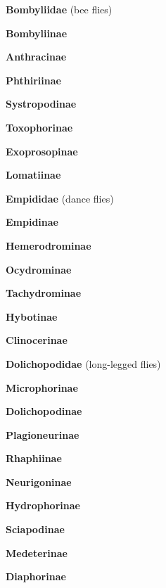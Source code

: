 \documentclass[letterpaper,10pt]{article}
\begin{document}
{\makebox[0.6cm]{}  \textbf{Bombyliidae} (bee flies) \par
\makebox[0.8cm]{}  \textbf{Bombyliinae} \par
\makebox[0.8cm]{}  \textbf{Anthracinae} \par
\makebox[0.8cm]{}  \textbf{Phthiriinae} \par
\makebox[0.8cm]{}  \textbf{Systropodinae} \par
\makebox[0.8cm]{}  \textbf{Toxophorinae} \par
\makebox[0.8cm]{}  \textbf{Exoprosopinae} \par
\makebox[0.8cm]{}  \textbf{Lomatiinae} \par
\makebox[0.6cm]{}  \textbf{Empididae} (dance flies) \par
\makebox[0.8cm]{}  \textbf{Empidinae} \par
\makebox[0.8cm]{}  \textbf{Hemerodrominae} \par
\makebox[0.8cm]{}  \textbf{Ocydrominae} \par
\makebox[0.8cm]{}  \textbf{Tachydrominae} \par
\makebox[0.8cm]{}  \textbf{Hybotinae} \par
\makebox[0.8cm]{}  \textbf{Clinocerinae} \par
\makebox[0.6cm]{}  \textbf{Dolichopodidae} (long-legged flies) \par
\makebox[0.8cm]{}  \textbf{Microphorinae} \par
\makebox[0.8cm]{}  \textbf{Dolichopodinae} \par
\makebox[0.8cm]{}  \textbf{Plagioneurinae} \par
\makebox[0.8cm]{}  \textbf{Rhaphiinae} \par
\makebox[0.8cm]{}  \textbf{Neurigoninae} \par
\makebox[0.8cm]{}  \textbf{Hydrophorinae} \par
\makebox[0.8cm]{}  \textbf{Sciapodinae} \par
\makebox[0.8cm]{}  \textbf{Medeterinae} \par
\makebox[0.8cm]{}  \textbf{Diaphorinae} \par
}
\end{document}
